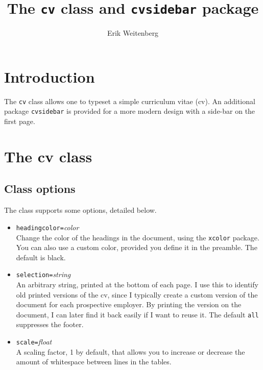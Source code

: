 \documentclass{article}
\title{The \texttt{cv} class and \texttt{cvsidebar} package}
\author{Erik Weitenberg}
\begin{document}
\maketitle

\section{Introduction}
The \texttt{cv} class allows one to typeset a simple curriculum vitae (cv).
An additional package \texttt{cvsidebar} is provided for a more modern design with a side-bar on the first page.

\section{The cv class}
\subsection{Class options}
The class supports some options, detailed below.
\begin{itemize}
	\item \texttt{headingcolor=}\textit{color} \\
		Change the color of the headings in the document, using the \texttt{xcolor} package.
		You can also use a custom color, provided you define it in the preamble.
		The default is black.
	\item \texttt{selection=}\textit{string} \\
		An arbitrary string, printed at the bottom of each page.
		I use this to identify old printed versions of the cv, since I typically create a custom version of the document for each prospective employer.
		By printing the version on the document, I can later find it back easily if I want to reuse it.
		The default \texttt{all} suppresses the footer.
	\item \texttt{scale=}\textit{float} \\
		A scaling factor, 1 by default, that allows you to increase or decrease the amount of whitespace between lines in the tables.
\end{itemize}
\end{document}
